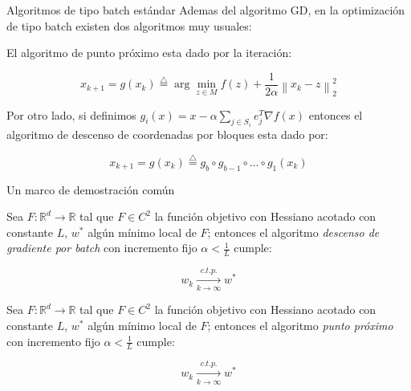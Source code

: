 \documentclass{beamer}
\newcommand{\R}{{\mathbb{R}}}
\newcommand{\norm}[1]{\left\lVert#1\right\rVert}
\newcommand{\Bigsum}[2]{\sum\limits_{#1}{#2}}
\begin{document}
\begin{frame}{Algoritmos de tipo batch est\'andar}
Ademas del algoritmo GD, en la optimizaci\'on de tipo batch existen dos algoritmos muy usuales:

\pause
\medskip

El algoritmo de punto pr\'oximo esta dado por la iteraci\'on:

\begin{equation*}
x_{k+1} = g(x_k) \stackrel{\triangle}{=} \arg \min\limits_{z \in M}{f(z) + \dfrac{1}{2\alpha}\norm{x_k - z}_{2}^{2}}
\end{equation*}

\pause
\medskip

Por otro lado, si definimos $g_i(x) = x - \alpha \Bigsum{j \in S_i}{e_j^T \nabla f(x)}$ entonces el algoritmo de descenso de coordenadas por bloques esta dado por:

	\begin{equation*}
	x_{k+1} = g(x_k) \stackrel{\triangle}{=} g_b \circ g_{b-1} \circ \dots \circ g_1(x_k)
	\end{equation*}





\end{frame}

\begin{frame}{Un marco de demostraci\'on com\'un}
\begin{theorem}
	Sea $F: \R^d \rightarrow \R$ tal que $F \in C^2$ la funci\'on objetivo con Hessiano acotado con constante $L$, $w^*$ alg\'un m\'inimo local de $F$; entonces el algoritmo \textit{descenso de gradiente por batch} con incremento fijo $\alpha < \frac{1}{L}$ cumple:
	
	\begin{equation*}
	w_k \xrightarrow[k \rightarrow \infty]{c.t.p.} w^*
	\end{equation*}
	
\end{theorem}

\smallskip

\begin{theorem}
	Sea $F: \R^d \rightarrow \R$ tal que $F \in C^2$ la funci\'on objetivo con Hessiano acotado con constante $L$, $w^*$ alg\'un m\'inimo local de $F$; entonces el algoritmo \textit{punto pr\'oximo } con incremento fijo $\alpha < \frac{1}{L}$ cumple:
	
	\begin{equation*}
	w_k \xrightarrow[k \rightarrow \infty]{c.t.p.} w^*
	\end{equation*}
	
\end{theorem}

\end{frame}
\end{document}
